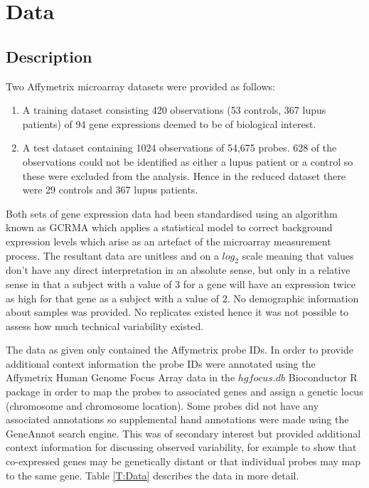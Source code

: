 \documentclass[a4paper, 12pt]{report}
\begin{document}
\section{Data} 

\subsection*{Description}
Two Affymetrix microarray datasets were provided as follows:

\begin{enumerate}
\item A training dataset consisting 420 observations (53 controls, 367 lupus patients) of 94 gene expressions deemed to be of biological interest.
\item A test dataset containing 1024 observations of 54,675 probes. 628 of the observations could not be identified as either a lupus patient or a control so these were excluded from the analysis. Hence in the reduced dataset there were 29 controls and 367 lupus patients.
\end{enumerate}

Both sets of gene expression data had been standardised using an algorithm known as GCRMA \cite{GCRMA} which applies a statistical model to correct background expression levels which arise as an artefact of the microarray measurement process. The resultant data are unitless and on a $log_2$ scale meaning that values don't have any direct interpretation in an absolute sense, but only in a relative sense in that a subject with a value of 3 for a gene will have an expression twice as high for that gene as a subject with a value of 2. No demographic information about samples was provided. No replicates existed hence it was not possible to assess how much technical variability existed.

The data as given only contained the Affymetrix probe IDs. In order to provide additional context information the probe IDs were annotated using the Affymetrix Human Genome Focus Array data in the $hgfocus.db$ \cite{hgfocus.db} Bioconductor R package in order to map the probes to associated genes and assign a genetic locus (chromosome and chromosome location). Some probes did not have any associated annotations so supplemental hand annotations were made using the GeneAnnot\cite{GeneAnnot} search engine. This was of secondary interest but provided additional context information for discussing observed variability, for example to show that co-expressed genes may be genetically distant or that individual probes may map to the same gene. Table \ref{T:Data} describes the data in more detail. 
\end{document}
